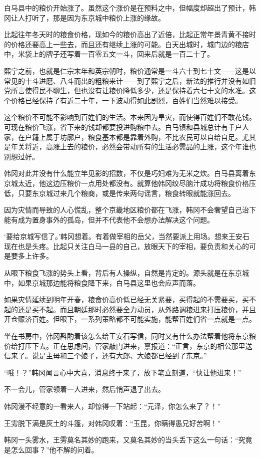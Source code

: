 白马县中的粮价开始涨了。虽然这个涨价是在预料之中，但幅度却超出了预计，韩冈让人打听了，那是因为东京城中粮价上涨的缘故。

比起往年冬天时的粮食价格，现如今的粮价高出了近倍，比起正常年景青黄不接时的价格还要高上一些去，而且还有继续上涨的可能。白天出城时，城门边的粮店中，米袋上的牌子还写着一百零五文一斗，回来后就是一百二十了。

熙宁之前，也就是仁宗末年和英宗朝时，粮价通常是一斗六十到七十文——这是以常见的十斗进磨、八斗而出的粗粮来计——到了熙宁之后，新法的推行并没有如旧党所言使得民不聊生，但也没有让粮价降低多少，还是保持着六七十文的水准。这个价格已经保持了有近二十年，一下波动得如此剧烈，百姓们当然难以接受。

这个粮价不可能不影响到百姓们的生活。本来因为旱灾，而使得百姓们不敢花钱。可现在粮价飞涨，省下来的钱却都要投进购粮中去。白马镇和县城总计有千户人家，在户籍上属于坊廓户，粮食基本都是靠着外购，不比农民可以自给自足。尤其是年关将近，高涨上去的粮价，必然会带动所有的生活必需品的上涨，这个年谁也别想过好。

韩冈对此并没有什么能立竿见影的招数，不仅是巧妇难为无米之炊。白马县离着东京城太近，他这边压粮价一点用处都没有。就算他韩冈绞尽脑汁成功将粮食价格压低，只要东京城过来几个粮商，或是传来两句谣言，粮食转眼就能涨回去。

因为灾情而导致的人心慌乱，整个京畿地区粮价都在飞涨，韩冈不会奢望自己治下能有成为置身事外的孤岛，但并不代表他不会想办法解决这个问题。

‘要给京城写信了。’韩冈想着。有着做宰相的岳父，当然要派上用场。想来王安石现在也是头疼。比起只关注白马一县的自己，放眼天下的宰相，要负责和关心的可是要多上许多。

从眼下粮食飞涨的势头上看，背后有人操纵，自然是肯定的。源头就是在东京城中，如果京城那边能将粮食降下来，白马县这里也会应声而落。

如果灾情延续到明年开春，粮食价高价低已经无关紧要，买得起的不需要买，买不起的还是买不起。而且朝廷那时必然要全力动员，从外路调粮进来打压粮价，并且开仓赈济百姓。但眼下，一系列策略都不可能实施，能帮百姓们省一点就是一点。

坐在书房中，韩冈斟酌着该怎么给王安石写信，同时又有什么办法帮着他将东京粮价给打压下去。正在思虑间，管家敲门进来，禀报道：“正言，东京的相公那里送信来了。说是主母和三个娘子，还有大郎、大娘都已经到了东京。”

“哦！？”韩冈闻言心中大喜，消息终于来了，放下笔立刻道，“快让他进来！”

不一会儿，管家领着一人进来，然后悄声退了出去。

韩冈漫不经意的一看来人，却惊得一下站起：“元泽，你怎么来了？！”

王雱脱下满是灰土的斗篷，对韩冈叹着：“玉昆，你瞒得愚兄好苦啊！”

韩冈一头雾水，王雱莫名其妙的跑来，又莫名其妙的当头丢下这么一句话：“究竟是怎么回事？”他不解的问着。

